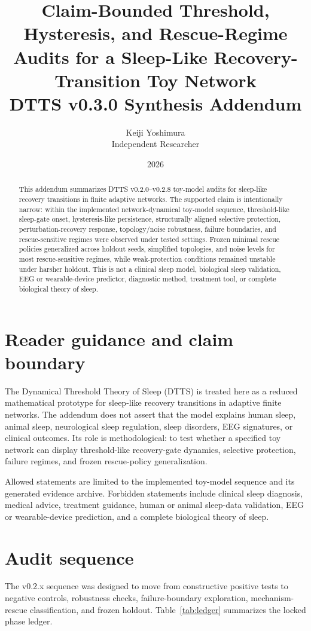 \documentclass[11pt,a4paper]{article}
\title{Claim-Bounded Threshold, Hysteresis, and Rescue-Regime Audits for a Sleep-Like Recovery-Transition Toy Network\\\large DTTS v0.3.0 Synthesis Addendum}
\author{Keiji Yoshimura\\Independent Researcher}
\date{2026}
\begin{document}
\maketitle

\begin{abstract}
This addendum summarizes DTTS v0.2.0--v0.2.8 toy-model audits for sleep-like recovery transitions in finite adaptive networks. The supported claim is intentionally narrow: within the implemented network-dynamical toy-model sequence, threshold-like sleep-gate onset, hysteresis-like persistence, structurally aligned selective protection, perturbation-recovery response, topology/noise robustness, failure boundaries, and rescue-sensitive regimes were observed under tested settings. Frozen minimal rescue policies generalized across holdout seeds, simplified topologies, and noise levels for most rescue-sensitive regimes, while weak-protection conditions remained unstable under harsher holdout. This is not a clinical sleep model, biological sleep validation, EEG or wearable-device predictor, diagnostic method, treatment tool, or complete biological theory of sleep.
\end{abstract}

\section{Reader guidance and claim boundary}
The Dynamical Threshold Theory of Sleep (DTTS) is treated here as a reduced mathematical prototype for sleep-like recovery transitions in adaptive finite networks. The addendum does not assert that the model explains human sleep, animal sleep, neurological sleep regulation, sleep disorders, EEG signatures, or clinical outcomes. Its role is methodological: to test whether a specified toy network can display threshold-like recovery-gate dynamics, selective protection, failure regimes, and frozen rescue-policy generalization.

Allowed statements are limited to the implemented toy-model sequence and its generated evidence archive. Forbidden statements include clinical sleep diagnosis, medical advice, treatment guidance, human or animal sleep-data validation, EEG or wearable-device prediction, and a complete biological theory of sleep.

\section{Audit sequence}
The v0.2.x sequence was designed to move from constructive positive tests to negative controls, robustness checks, failure-boundary exploration, mechanism-rescue classification, and frozen holdout. Table~\ref{tab:ledger} summarizes the locked phase ledger.
\end{document}
